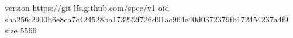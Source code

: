 version https://git-lfs.github.com/spec/v1
oid sha256:2900b6e8ca7c424528ba173222f726d91ac964e40d0372379fb172454237a4f9
size 5566
